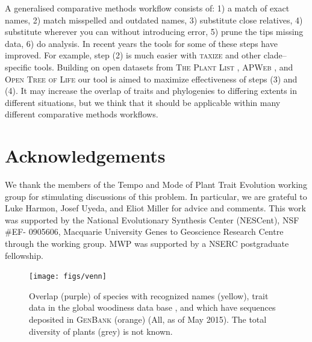 \documentclass[a4paper,11pt]{article}
\begin{document}
A generalised comparative methods workflow consists of:  1) a match of exact names, 2) match misspelled and outdated names, 3) substitute close relatives, 4) substitute wherever you can without introducing error, 5) prune the tips missing data, 6) do analysis.  In recent years the tools for some of these steps have improved.  For example, step (2) is much easier with \textsc{taxize} \citep{taxize} and other clade--specific tools.  Building on open datasets from \textsc{The Plant List} \citep{ThePlantList}, \textsc{APWeb} \citep{apweb}, and \textsc{Open Tree of Life} \citep{OpenTree} our tool is aimed to maximize effectiveness of steps (3) and (4).  It may increase the overlap of traits and phylogenies to differing extents in different situations, but we think that it should be applicable within many different comparative methods workflows.

\section{Acknowledgements}
We thank the members of the Tempo and Mode of Plant Trait
Evolution working group for stimulating discussions of this problem. In particular, we are grateful to Luke Harmon, Josef Uyeda, and Eliot Miller for advice and comments. This work was supported by the National Evolutionary Synthesis Center
(NESCent), NSF \#EF- 0905606, Macquarie University Genes to Geoscience
Research Centre through the working group. MWP was supported by a NSERC postgraduate fellowship. 


\clearpage




\begin{figure}[p]
\texttt{[image: figs/venn]}
\caption{Overlap (purple) of species with recognized names (yellow), trait data in the global woodiness data base \citep[blue][]{Zanne, FitzJohn2014}, and which have sequences deposited in \textsc{GenBank} (orange) (All, as of May 2015). The total diversity of plants (grey) is not known.}
\label{fig:venn}
\end{figure}
\end{document}

